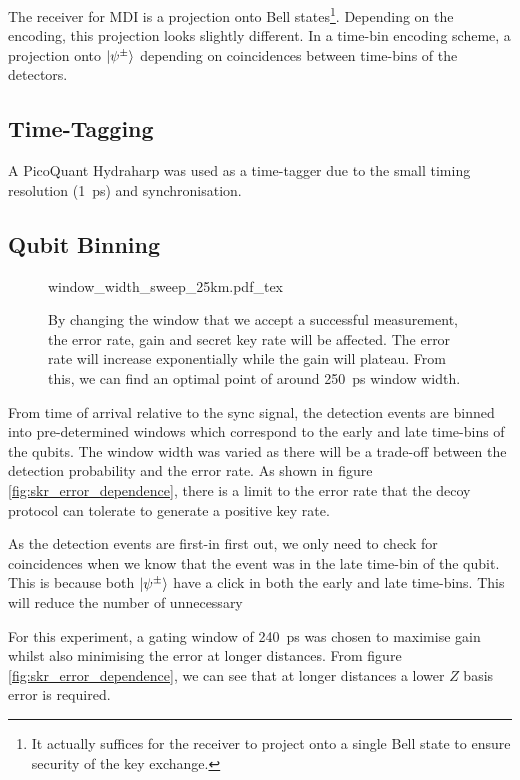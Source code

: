 The receiver for \ac{MDI} is a projection onto Bell states\footnote{It actually suffices for the receiver to project onto a single Bell state to ensure security of the key exchange.}. Depending on the encoding, this projection looks slightly different. In a time-bin encoding scheme, a projection onto $\ket{\psi^\pm}$ depending on coincidences between time-bins of the detectors.

\subsection{Time-Tagging}

A PicoQuant Hydraharp was used as a time-tagger due to the small timing resolution (\SI{1}{ps}) and synchronisation.

\subsection{Qubit Binning}

\begin{figure}[tbp]
	\centering
	\tiny
	\def\svgwidth{\textwidth} 
	{window_width_sweep_25km.pdf_tex}
	\caption[Qubit window width sweep]{By changing the window that we accept a successful measurement, the error rate, gain and secret key rate will be affected. The error rate will increase exponentially while the gain will plateau. From this, we can find an optimal point of around \SI{250}{\ps} window width.}
	\label{fig:window_sweep}
\end{figure}

From time of arrival relative to the sync signal, the detection events are binned into pre-determined windows which correspond to the early and late time-bins of the qubits. The window width was varied as there will be a trade-off between the detection probability and the error rate. As shown in figure \ref{fig:skr_error_dependence}, there is a limit to the error rate that the decoy protocol can tolerate to generate a positive key rate.

As the detection events are first-in first out, we only need to check for coincidences when we know that the event was in the late time-bin of the qubit. This is because both $\ket{\psi^\pm}$ have a click in both the early and late time-bins. This will reduce the number of unnecessary 

For this experiment, a gating window of \SI{240}{\ps} was chosen to maximise gain whilst also minimising the error at longer distances. From figure \ref{fig:skr_error_dependence}, we can see that at longer distances a lower $Z$ basis error is required.

